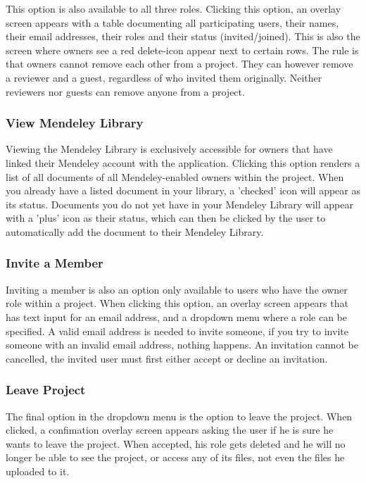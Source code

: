 This option is also available to all three roles. Clicking this option, an overlay screen appears with a table documenting all participating
users, their names, their email addresses, their roles and their status (invited/joined). This is also the screen where owners see a red
delete-icon appear next to certain rows. The rule is that owners cannot remove each other from a project. They can however remove a reviewer 
and a guest, regardless of who invited them originally. Neither reviewers nor guests can remove anyone from a project.

\subsubsection{View Mendeley Library}

Viewing the Mendeley Library is exclusively accessible for owners that have linked their Mendeley account with the application. Clicking this
option renders a list of all documents of all Mendeley-enabled owners within the project. When you already have a listed document in your library, a 
'checked' icon will appear as its status. Documents you do not yet have in your Mendeley Library will appear with a 'plus' icon as their status,
which can then be clicked by the user to automatically add the document to their Mendeley Library.

\subsubsection{Invite a Member}

Inviting a member is also an option only available to users who have the owner role within a project. When clicking this option, an overlay
screen appears that has text input for an email address, and a dropdown menu where a role can be specified. A valid email address is needed
to invite someone, if you try to invite someone with an invalid email address, nothing happens. An invitation cannot be cancelled, the 
invited user must first either accept or decline an invitation.

\subsubsection{Leave Project}

The final option in the dropdown menu is the option to leave the project. When clicked, a confimation overlay screen appears asking the user
if he is sure he wants to leave the project. When accepted, his role gets deleted and he will no longer be able to see the project, or
access any of its files, not even the files he uploaded to it. 

